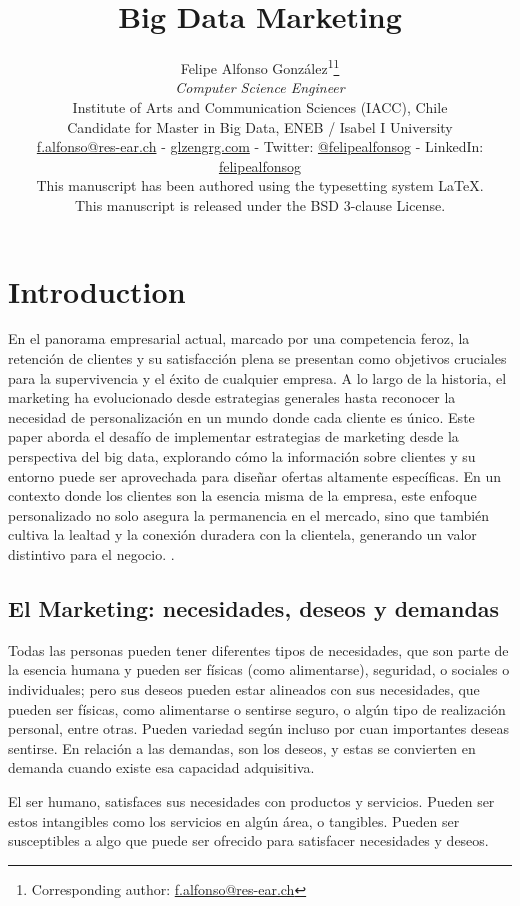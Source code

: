 \documentclass[
    a4paper, %
    10pt, %
    unnumberedsections, %
    twoside, %
]{LTJournalArticle}
\title{Big Data Marketing}
\author{%
    Felipe Alfonso González\textsuperscript{1}\thanks{Corresponding author: \href{mailto:f.alfonso@res-ear.ch}{f.alfonso@res-ear.ch}}\\
    \textit{ Computer Science Engineer}\\
    \footnotesize Institute of Arts and Communication Sciences (IACC), Chile\\[-6pt]
    \footnotesize Candidate for Master in Big Data, ENEB / Isabel I University\\[-6pt]
    \footnotesize\href{mailto:f.alfonso@res-ear.ch}{f.alfonso@res-ear.ch} - 
    \href{https://glzengrg.com}{glzengrg.com} - 
    Twitter: \href{https://twitter.com/felipealfonsog}{@felipealfonsog} - 
    LinkedIn: \href{https://linkedin.com/in/felipealfonsog}{felipealfonsog}\\
    \scriptsize This manuscript has been authored using the typesetting system \LaTeX{}. \\[-6pt]
    \scriptsize This manuscript is released under the BSD 3-clause License. \\
}
\begin{document}
\maketitle %


\section{Introduction}

En el panorama empresarial actual, marcado por una competencia feroz, la retención de clientes y su satisfacción plena se presentan como objetivos cruciales para la supervivencia y el éxito de cualquier empresa. A lo largo de la historia, el marketing ha evolucionado desde estrategias generales hasta reconocer la necesidad de personalización en un mundo donde cada cliente es único. Este paper aborda el desafío de implementar estrategias de marketing desde la perspectiva del big data, explorando cómo la información sobre clientes y su entorno puede ser aprovechada para diseñar ofertas altamente específicas. En un contexto donde los clientes son la esencia misma de la empresa, este enfoque personalizado no solo asegura la permanencia en el mercado, sino que también cultiva la lealtad y la conexión duradera con la clientela, generando un valor distintivo para el negocio. \cite{ENEB2023}.

\subsection{El Marketing: necesidades, deseos y demandas}

Todas las personas pueden tener diferentes tipos de necesidades, que son parte de la esencia humana y pueden ser físicas (como alimentarse), seguridad, o sociales o individuales; pero sus deseos pueden estar alineados con sus necesidades, que pueden ser físicas, como alimentarse o sentirse seguro, o algún tipo de realización personal, entre otras. Pueden variedad según incluso por cuan importantes deseas sentirse. En relación a las demandas, son los deseos, y estas se convierten en demanda cuando existe esa capacidad adquisitiva. 

El ser humano, satisfaces sus necesidades con productos y servicios. Pueden ser estos intangibles como los servicios en algún área, o tangibles. Pueden ser susceptibles a algo que puede ser ofrecido para satisfacer necesidades y deseos. 
\end{document}

